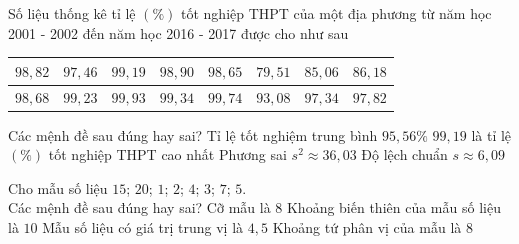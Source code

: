 \begin{ex}%
	Số liệu thống kê tỉ lệ $(\%)$ tốt nghiệp THPT của một địa phương từ năm học 2001 - 2002 đến năm học 2016 - 2017 được cho như sau
	\begin{center}
		\begin{tabular}{|c|c|c|c|c|c|c|c|}
			\hline $98{,}82$ & $97{,}46$ & $99{,}19$ & $98{,}90$ & $98{,}65$ & $79{,}51$ & $85{,}06$ & $86{,}18$  \\
			\hline $98{,}68$ & $99{,}23$ & $99{,}93$ & $99{,}34$ & $99{,}74$ & $93{,}08$ & $97{,}34$ & $97{,}82$ \\
			\hline 
		\end{tabular}
	\end{center}
	Các mệnh đề sau đúng hay sai?
	\choiceTF
	{\True Tỉ lệ tốt nghiệm trung bình $95{,}56 \%$}
	{$99{,}19$ là tỉ lệ $(\%)$ tốt nghiệp THPT cao nhất}
	{Phương sai $s^2\approx 36{,}03$}
	{\True Độ lệch chuẩn $s \approx 6{,}09$}
\end{ex}

\begin{ex}%
	Cho mẫu số liệu $15$; $20$; $1$; $2$; $4$; $3$; $7$; $5$.
	\\ Các mệnh đề sau đúng hay sai?
	\choiceTF
	{\True Cỡ mẫu là $8$}
	{Khoảng biến thiên của mẫu số liệu là $10$}
	{\True Mẫu số liệu có giá trị trung vị là $4{,}5$}
	{Khoảng tứ phân vị của mẫu là $8$}
\end{ex}

